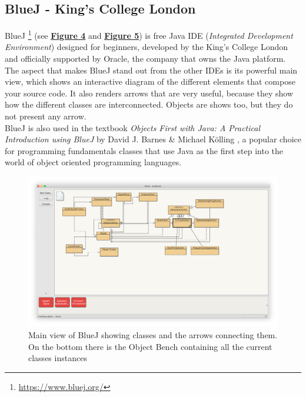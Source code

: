 \documentclass[]{usiinfbachelorproject}
\begin{document}
\subsection{BlueJ - King's College London}

BlueJ \footnote{\url{https://www.bluej.org/}} (see \hyperref[bluej_classes_objects]{\textbf{Figure 4}} and \hyperref[bluej_objects_open]{\textbf{Figure 5}}) is free Java IDE (\emph{Integrated Development Environment}) designed for beginners, developed by the King's College London and officially supported by Oracle, the company that owns the Java platform.
The aspect that makes BlueJ stand out from the other IDEs is its powerful main view, which shows an interactive diagram of the different elements that compose your source code. It also renders arrows that are very useful, because they show how the different classes are interconnected. Objects are shows too, but they do not present any arrow.\\
BlueJ is also used in the textbook \emph{Objects First with Java: A Practical Introduction using BlueJ} by David J. Barnes \& Michael K\"{o}lling \cite{barnes2016objects}, a popular choice for programming fundamentals classes that use Java as the first step into the world of object oriented programming languages.

\begin{figure}[h!]
\centering
\includegraphics[width=\textwidth]{figures/bluej_classes_objects.png}
\caption {Main view of BlueJ showing classes and the arrows connecting them. On the bottom there is the Object Bench containing all the current classes instances}
\label {bluej_classes_objects}
\end{figure}
\end{document}
